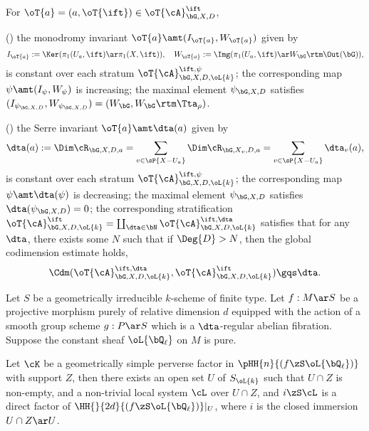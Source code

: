\documentclass[article, a4paper, twoside]{universal}
\begin{document}
\begin{thm}
	For $\oT{a}=(a,\oT{\ift})\in\oT{\cA}_{\bG,X,D}^{\ift}$,
	\begin{itm}
		\item (\cite[Proposition~5.4.3, Lemma~5.4.5, Lemma~5.4.8]{Ngo2010Lemme}) the monodromy invariant $\oT{a}\amt(I_{\oT{a}},W_{\oT{a}})$ given by
	\[
		I_{\oT{a}}:=\Ker(\pi_{1}(U_{a},\ift)\ar\pi_{1}(X,\ift)),\quad W_{\oT{a}}:=\Img(\pi_{1}(U_{a},\ift)\ar W_{\bG}\rtm\Out(\bG)),
	\]
	is constant over each stratum $\oT{\cA}_{\bG,X,D,\oL{k}}^{\ift,\psi}$; the corresponding map $\psi\amt(I_{\psi},W_{\psi})$ is increasing; the maximal element $\psi_{\bG,X,D}$ satisfies $(I_{\psi_{\bG,X,D}},W_{\psi_{\bG,X,D}})=(W_{\bG},W_{\bG}\rtm\Tta_{\rho})$.
	\item (\cite[Lemma~5.6.1, Lemma~5.6.4, Proposition~5.7.2]{Ngo2010Lemme}) the Serre invariant $\oT{a}\amt\dta(a)$ given by
	\[
		\dta(a):=\Dim\cR_{\bG,X,D,a}=\sum_{v\in \sP{X-U_{a}}}\Dim\cR_{\bG,X_{v},D,a}=\sum_{v\in \sP{X-U_{a}}}\dta_{v}(a),
	\]
	is constant over each stratum $\oT{\cA}_{\bG,X,D,\oL{k}}^{\ift,\psi}$; the corresponding map $\psi\amt\dta(\psi)$ is decreasing; the maximal element $\psi_{\bG,X,D}$ satisfies $\dta(\psi_{\bG,X,D})=0$; the corresponding stratification $\oT{\cA}_{\bG,X,D,\oL{k}}^{\ift}=\coprod_{\dta\in\bN}\oT{\cA}_{\bG,X,D,\oL{k}}^{\ift,\dta}$ satisfies that for any $\dta$, there exists some $N$ such that if $\Deg{D}>N$, then the global codimension estimate holds,
	\[
		\Cdm(\oT{\cA}_{\bG,X,D,\oL{k}}^{\ift,\dta},\oT{\cA}_{\bG,X,D,\oL{k}}^{\ift})\gqs\dta.
	\]
	\end{itm}
\end{thm}

\begin{thm}
	Let $S$ be a geometrically irreducible $k$-scheme of finite type. Let $f:M\ar S$ be a projective morphism purely of relative dimension $d$ equipped with the action of a smooth group scheme $g:P\ar S$ which is a $\dta$-regular abelian fibration. Suppose the constant sheaf $\oL{\bQ_{\ell}}$ on $M$ is pure.

	Let $\cK$ be a geometrically simple perverse factor in $\pHH{n}{(f\zS\oL{\bQ_{\ell}})}$ with support $Z$, then there exists an open set $U$ of $S_{\oL{k}}$ such that $U\cap Z$ is non-empty, and a non-trivial local system $\cL$ over $U\cap Z$, and $i\zS\cL$ is a direct factor of $\HH{}{2d}{(f\zS\oL{\bQ_{\ell}})}|_{U}$, where $i$ is the closed immersion $U\cap Z\ar U$.
\end{thm}
\end{document}
